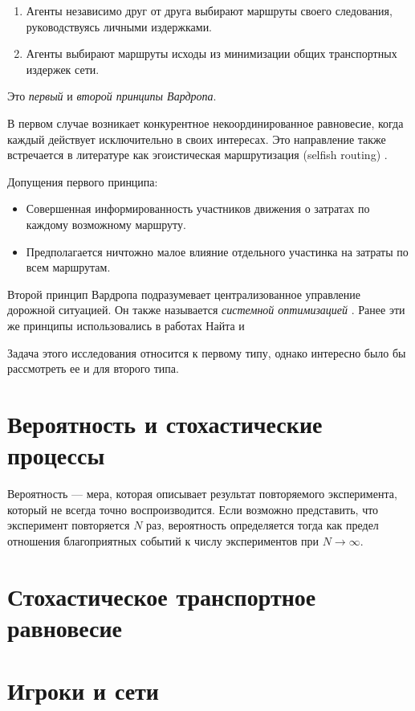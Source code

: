 \begin{enumerate}
	\item Агенты независимо друг от друга выбирают маршруты своего следования, руководствуясь личными издержками.
	\item Агенты выбирают маршруты исходы из минимизации общих транспортных издержек сети.
\end{enumerate}

Это \textit{первый} и \textit{второй принципы Вардропа}.

В первом случае возникает конкурентное некоординированное равновесие, когда каждый действует исключительно в своих интересах. Это направление также встречается в литературе как эгоистическая маршрутизация (selfish routing) \cite[3]{rough2005}.

Допущения первого принципа:
\begin{itemize}
	\item Совершенная информированность участников движения о затратах по каждому возможному маршруту.
	\item Предполагается ничтожно малое влияние отдельного участинка на затраты по всем маршрутам.
\end{itemize}

Второй принцип Вардропа подразумевает централизованное управление дорожной ситуацией. Он также называется \textit{системной оптимизацией} \cite[26-27]{gas}. Ранее эти же принципы использовались в работах Найта \cite{knight} и 

Задача этого исследования относится к первому типу, однако интересно было бы рассмотреть ее и для второго типа. 


\section{Вероятность и стохастические процессы}

Вероятность --- мера, которая описывает результат повторяемого эксперимента, который не всегда точно воспроизводится. Если возможно представить, что эксперимент повторяется $N$ раз, вероятность определяется тогда как предел отношения благоприятных событий к числу экспериментов при $N\to\infty$.


\section{Стохастическое транспортное равновесие} \cite[316, Ю. Е. Нестеров, С. В. Шпирко]{gas}

\section{Игроки и сети} \cite[4]{GandN}

